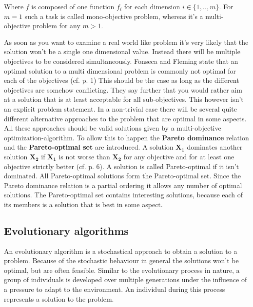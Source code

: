 \documentclass[12pt,twoside]{article}
\theoremstyle{plain}
\theoremstyle{definition}
\theoremstyle{remark}
\begin{document}
Where $f$ is composed of one function $f_i$ for each dimension $i \in \{1,..,m\}$.  
For $m = 1$ such a task is called mono-objective problem, whereas it's a multi-objective problem for any $m > 1$.

As soon as you want to examine a real world like problem it's very likely that the solution won't be a single one dimensional value. Instead there will be multiple objectives to be considered simultaneously.
Fonseca and Fleming state that an optimal solution to a multi dimensional problem is commonly not optimal for each of the objectives (cf. \cite{fonseca1995overview} p. 1)
This should be the case as long as the different objectives are somehow conflicting.
They say further that you would rather aim at a solution that is at least acceptable for all sub-objectives.
This however isn't an explicit problem statement. In a non-trivial case there will be several quite different alternative approaches to the problem that are optimal in some aspects.
All these approaches should be valid solutions given by a multi-objective optimization-algorithm.
To allow this to happen the \textbf{Pareto dominance} relation and the \textbf{Pareto-optimal set} are introduced.
A solution $\mathbf{X_1}$ dominates another solution $\mathbf{X_2}$ if $\mathbf{X_1}$ is not worse than $\mathbf{X_2}$ for any objective and for at least one objective strictly better (cf. \cite{doncieux2015multi} p. 6).
A solution is called Pareto-optimal if it isn't dominated. All Pareto-optimal solutions form the Pareto-optimal set. 
Since the Pareto dominance relation is a partial ordering it allows any number of optimal solutions.
The Pareto-optimal set contains interesting solutions, because each of its members is a solution that is best in some aspect.

\subsection{Evolutionary algorithms}
\label{back:evo}
An evolutionary algorithm is a stochastical approach to obtain a solution to a problem. Because of the stochastic behaviour in general the solutions won't be optimal, but are often feasible. Similar to the evolutionary process in nature, a group of individuals is developed over multiple generations under the influence of a pressure to adapt to the environment. An individual during this process represents a solution to the problem.\medskip
\end{document}
